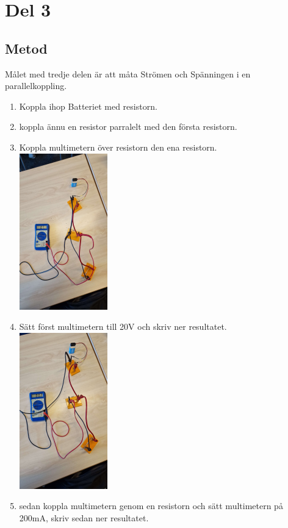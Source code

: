 \documentclass[11p]{article}
\begin{document}
    \section{Del 3}
    \subsection{Metod}
    Målet med tredje delen är att måta Strömen och Spänningen i en parallelkoppling.

    \begin{enumerate}
        \item Koppla ihop Batteriet med resistorn.
        \item koppla ännu en resistor parralelt med den första resistorn.
        \item Koppla multimetern över resistorn den ena resistorn.
        \\
        \includegraphics[width=0.3\textwidth]{images/3Volt.jpg}
        \item Sätt först multimetern till 20V och skriv ner resultatet.
        \\
        \includegraphics[width=0.3\textwidth]{images/3Ampere.jpg}
        \item sedan koppla multimetern genom en resistorn och sätt multimetern på 200mA, skriv sedan ner resultatet.
    \end{enumerate}
\end{document}
